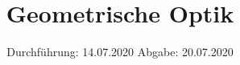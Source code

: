 

\subject{V408}
\title{Geometrische Optik}
\date{%
  Durchführung: 14.07.2020
  \hspace{3em}
  Abgabe: 20.07.2020
}



\maketitle
\thispagestyle{empty}
\tableofcontents
\newpage







\printbibliography{}


